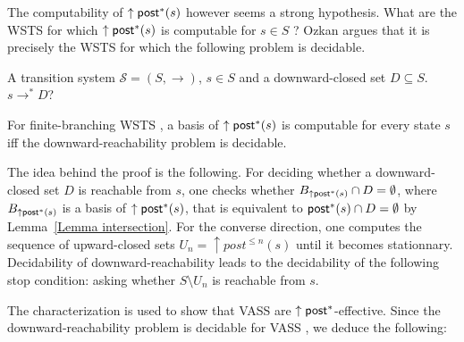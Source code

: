 \iffalse
\alain{definir downward reachability problem.....
downward-closed problem given a state $s$ of a WSTS
with strong compatibility 
and a decidable downward-closed set $D$, it can be decided whether $\exists s' \in D ~ s \to^* s'$. }
\fi


The computability of $\uparrow \textsf{post}^*(s)$ however seems a strong hypothesis. What are the WSTS for which $\uparrow \textsf{post}^*(s)$ is computable for $s \in S$ ?
Ozkan \cite{DBLP:conf/gg/Ozkan22} argues that it is precisely the WSTS for which the following problem is decidable.

{A transition system $\mathscr{S}=(S,\rightarrow)$, $s \in S$ and a downward-closed set $D
\subseteq S$.}
{$s  \to^* D$? \newline}

\begin{proposition}\label{post*}
For finite-branching WSTS%
, a basis of $\uparrow \textsf{post}^*(s)$ is computable for every state $s$ iff the downward-reachability problem is decidable.
\end{proposition}

The idea behind the proof is the following. For deciding whether a downward-closed set $D$ is reachable from $s$, one checks whether
$B_{\uparrow \textsf{post}^*(s)} \cap D = \emptyset$, 
where $B_{\uparrow \textsf{post}^*(s)}$ is a basis of $\uparrow \textsf{post}^*(s)$,
 that is equivalent to $\textsf{post}^*(s)\cap D = \emptyset$ by
Lemma~\ref{Lemma intersection}. For the converse direction, one computes the sequence of upward-closed sets
$U_n = \uparrow post^{\leq n}(s)$ until it becomes stationnary. 
Decidability of downward-reachability leads to the decidability of the following stop condition:
asking whether $S \setminus U_n$ is reachable from $s$.


The characterization is used to show that VASS are $\uparrow \textsf{post}^*$-effective. Since the downward-reachability problem is decidable for VASS , we  
deduce the following:


